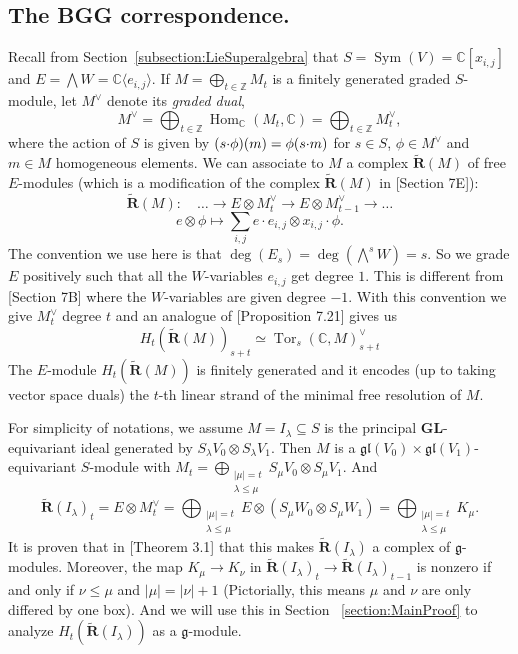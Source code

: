 \documentclass[12pt]{amsart}
\theoremstyle{definition}
\theoremstyle{remark}
\newcommand{\bbC}{\mathbb{C}}
\newcommand{\bR}{\mathbf{R}}
\newcommand{\bbZ}{\mathbb{Z}}
\newcommand{\fg}{\mathfrak{g}}
\newcommand{\dsum}{\bigoplus}
\newcommand{\GL}{\mathbf{GL}}
\newcommand{\gl}{\mathfrak{gl}}
\newcommand{\Hom}{\operatorname{Hom}}
\newcommand{\Sym}{\operatorname{Sym}}
\newcommand{\Tor}{\operatorname{Tor}}
\newcommand{\DS}{\displaystyle}
\numberwithin{equation}{section}
\newcommand{\smcdot}{{\textup{$\cdot$}}}
\begin{document}
\subsection{The BGG correspondence.} \label{subsec:BGG}
Recall from Section~\ref{subsection:LieSuperalgebra} that $S = \Sym(V) = \bbC[x_{i,j}]$ and $E = \bigwedge W = \bbC \langle e_{i,j} \rangle$. If $M = \dsum_{t \in \bbZ} M_t$ is a finitely generated graded $S$-module, let $M^{\vee}$ denote its \emph{graded dual},
\[
\DS M^{\vee} = \dsum_{t \in \bbZ} \Hom_{\bbC} (M_t, \bbC) = \dsum_{t \in \bbZ} M_t^{\vee},
\]
where the action of $S$ is given by $(s \smcdot \phi)(m) = \phi(s \smcdot m)$ for $s \in S$, $\phi \in M^{\vee}$ and $m \in M$ homogeneous elements. We can associate to $M$ a complex $\tilde{\bR}(M)$ of free $E$-modules (which is a modification of the complex $\tilde{\bR}(M)$ in \cite{Eis05}[Section 7E]):
\[
\tilde{\bR}(M) \colon \quad \ldots \to E \otimes M_t^{\vee} \to E \otimes M_{t-1}^{\vee} \to \ldots
\]
\[
\DS e \otimes \phi \mapsto \sum_{i,j} e \cdot e_{i,j} \otimes x_{i,j} \cdot \phi.
\]
The convention we use here is that $\deg(E_s) = \deg(\bigwedge^s W) = s$. So we grade $E$ positively such that all the $W$-variables $e_{i,j}$ get degree $1$. This is different from \cite{Eis05}[Section 7B] where the $W$-variables are given degree $-1$. With this convention we give $M_t^{\vee}$ degree $t$ and an analogue of \cite{Eis05}[Proposition 7.21] gives us
\[
H_t(\tilde{\bR}(M))_{s+t} \simeq \Tor_s(\bbC,M)_{s+t}^{\vee}
\]
The $E$-module $H_t(\tilde{\bR}(M))$ is finitely generated and it encodes (up to taking vector space duals) the $t$-th linear strand of the minimal free resolution of $M$.

For simplicity of notations, we assume $M = I_{\lambda} \subseteq S$ is the principal $\GL$-equivariant ideal generated by $S_{\lambda} V_0 \otimes S_{\lambda} V_1$. Then $M$ is a $\gl(V_0) \times \gl(V_1)$-equivariant $S$-module with $M_t = \dsum_{\substack{|\mu| = t \\ \lambda \leq \mu}} S_{\mu} V_0 \otimes S_{\mu} V_1$. And
\[
\DS \tilde{\bR}(I_{\lambda})_t = E \otimes M_t^{\vee} = \dsum_{\substack{|\mu| = t \\ \lambda \leq \mu}} E \otimes (S_{\mu} W_0 \otimes S_{\mu} W_1) = \dsum_{\substack{|\mu| = t \\ \lambda \leq \mu}} K_{\mu}.
\]
It is proven that in \cite{RW}[Theorem 3.1] that this makes $\tilde{\bR}(I_{\lambda})$ a complex of $\fg$-modules. Moreover, the map $K_{\mu} \to K_{\nu}$ in $\tilde{\bR}(I_{\lambda})_t \to \tilde{\bR}(I_{\lambda})_{t-1}$ is nonzero if and only if $\nu \leq \mu$ and $|\mu| = |\nu| + 1$ (Pictorially, this means $\mu$ and $\nu$ are only differed by one box). And we will use this in Section ~\ref{section:MainProof} to analyze $H_t(\tilde{\bR}(I_{\lambda}))$ as a $\fg$-module.
\end{document}
